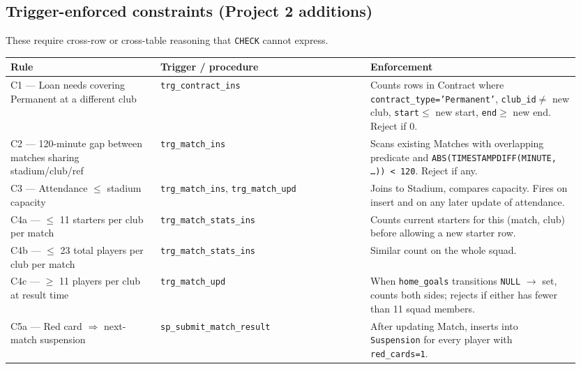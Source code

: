 \documentclass[11pt]{article}
\begin{document}
\subsection{Trigger-enforced constraints (Project 2 additions)}

These require cross-row or cross-table reasoning that \texttt{CHECK}
cannot express.

\begin{longtable}{@{}p{0.25\linewidth}p{0.35\linewidth}p{0.35\linewidth}@{}}
\toprule
\textbf{Rule} & \textbf{Trigger / procedure} & \textbf{Enforcement} \\
\midrule\endhead

C1 --- Loan needs covering Permanent at a different club &
  \texttt{trg\_contract\_ins} &
  Counts rows in Contract where \texttt{contract\_type='Permanent'},
  \texttt{club\_id}$\neq$ new club, \texttt{start}$\leq$ new start,
  \texttt{end}$\geq$ new end. Reject if 0. \\

C2 --- 120-minute gap between matches sharing stadium/club/ref &
  \texttt{trg\_match\_ins} &
  Scans existing Matches with overlapping predicate and
  \texttt{ABS(TIMESTAMPDIFF(MINUTE, \dots)) < 120}. Reject if any. \\

C3 --- Attendance $\leq$ stadium capacity &
  \texttt{trg\_match\_ins}, \texttt{trg\_match\_upd} &
  Joins to Stadium, compares capacity. Fires on insert and on any
  later update of attendance. \\

C4a --- $\leq$ 11 starters per club per match &
  \texttt{trg\_match\_stats\_ins} &
  Counts current starters for this (match, club) before allowing a
  new starter row. \\

C4b --- $\leq$ 23 total players per club per match &
  \texttt{trg\_match\_stats\_ins} &
  Similar count on the whole squad. \\

C4c --- $\geq$ 11 players per club at result time &
  \texttt{trg\_match\_upd} &
  When \texttt{home\_goals} transitions \texttt{NULL} $\to$ set, counts
  both sides; rejects if either has fewer than 11 squad members. \\

C5a --- Red card $\Rightarrow$ next-match suspension &
  \texttt{sp\_submit\_match\_result} &
  After updating Match, inserts into \texttt{Suspension} for every
  player with \texttt{red\_cards=1}. \\


\end{longtable}
\end{document}
